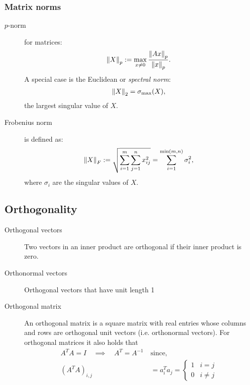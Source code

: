 \subsubsection{Matrix norms}
\begin{description}
    \item[$p$-norm] for matrices:
        \begin{align*}
            \left\lVert X\right\rVert_p := \max_{x\neq 0} {\left\lVert Ax\right\rVert_p \over \left\lVert x\right\rVert_p}.
        \end{align*}
        A special case is the Euclidean or \emph{spectral norm}:
        \begin{align*}
            \left\lVert X\right\rVert_2 = \sigma_\text{max} (X),
        \end{align*}
        the largest singular value of $X$.
    \item[Frobenius norm] is defined as:
        \begin{align*}
            \left\lVert X\right\rVert_F := \sqrt{\sum_{i=1}^m \sum_{j=1}^n x_{ij}^2} = \sum_{i=1}^{\text{min}(m,n)} \sigma_i^2,
        \end{align*}
        where $\sigma_i$ are the singular values of $X$.
        
        
\end{description}

\subsection{Orthogonality}
\begin{description}
    \item[Orthogonal vectors] Two vectors in an inner product are orthogonal if their inner product is zero.
    \item[Orthonormal vectors] Orthogonal vectors that have unit length 1
    \item[Orthogonal matrix] An orthogonal matrix is a square matrix with real entries whose columns and rows are orthogonal unit vectors (i.e. orthonormal vectors).
    For orthogonal matrices it also holds that
    \begin{align*}
        A^T A= I \quad \implies \quad A^T = A^{-1}\ &\text{since,}\\
        (A^TA)_{i,j} &= a_i^Ta_j = 
            \begin{cases}
                1&i=j\\
                0&i\neq j
            \end{cases}
    \end{align*}

\end{description}

